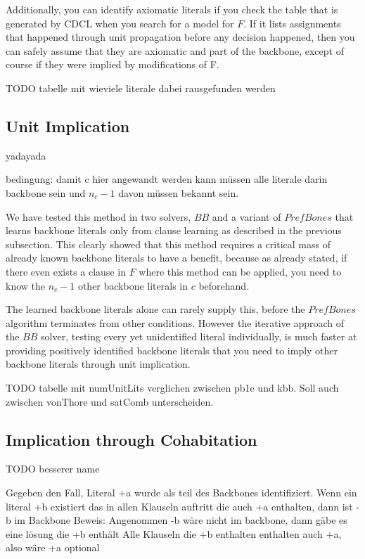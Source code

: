 Additionally, you can identify axiomatic literals if you check the table that is generated by CDCL when you search for a model for $F$. If it lists assignments that happened through unit propagation before any decision happened, then you can safely assume that they are axiomatic and part of the backbone, except of course if they were implied by modifications of F.

TODO tabelle mit wieviele literale dabei rausgefunden werden

\subsection{Unit Implication}

yadayada

bedingung: damit c hier angewandt werden kann müssen alle literale darin backbone sein und $n_c - 1$ davon müssen bekannt sein.


We have tested this method in two solvers, $BB$ and a variant of $PrefBones$ that learns backbone literals only from clause learning as described in the previous subsection. This clearly showed that this method requires a critical mass of already known backbone literals to have a benefit, because as already stated, if there even exists a clause in $F$ where this method can be applied, you need to know the $n_c - 1$ other backbone literals in $c$ beforehand.

The learned backbone literals alone can rarely supply this, before the $PrefBones$ algorithm terminates from other conditions. However the iterative approach of the $BB$ solver, testing every yet unidentified literal individually, is much faster at providing positively identified backbone literals that you need to imply other backbone literals through unit implication.

TODO tabelle mit numUnitLits verglichen zwischen pb1e und kbb. Soll auch zwischen vonThore und satComb unterscheiden.

\subsection{Implication through Cohabitation} TODO besserer name

Gegeben den Fall, Literal +a wurde als teil des Backbones identifiziert.\newline
Wenn ein literal +b existiert das in allen Klauseln auftritt die auch +a enthalten, dann ist -b im Backbone\newline
Beweis: Angenommen -b wäre nicht im backbone, dann gäbe es eine lösung die +b enthält\newline
Alle Klauseln die +b enthalten enthalten auch +a, also wäre +a optional\newline
